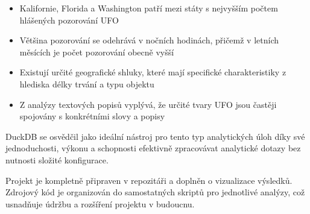 \documentclass[a4paper,12pt]{article}
\begin{document}
\begin{itemize}
    \item Kalifornie, Florida a Washington patří mezi státy s nejvyšším počtem hlášených pozorování UFO
    \item Většina pozorování se odehrává v nočních hodinách, přičemž v letních měsících je počet pozorování obecně vyšší
    \item Existují určité geografické shluky, které mají specifické charakteristiky z hlediska délky trvání a typu objektu
    \item Z analýzy textových popisů vyplývá, že určité tvary UFO jsou častěji spojovány s konkrétními slovy a popisy
\end{itemize}

DuckDB se osvědčil jako ideální nástroj pro tento typ analytických úloh díky své jednoduchosti, výkonu a schopnosti efektivně zpracovávat analytické dotazy bez nutnosti složité konfigurace.

Projekt je kompletně připraven v repozitáři a doplněn o vizualizace výsledků. Zdrojový kód je organizován do samostatných skriptů pro jednotlivé analýzy, což usnadňuje údržbu a rozšíření projektu v budoucnu.
\end{document}
